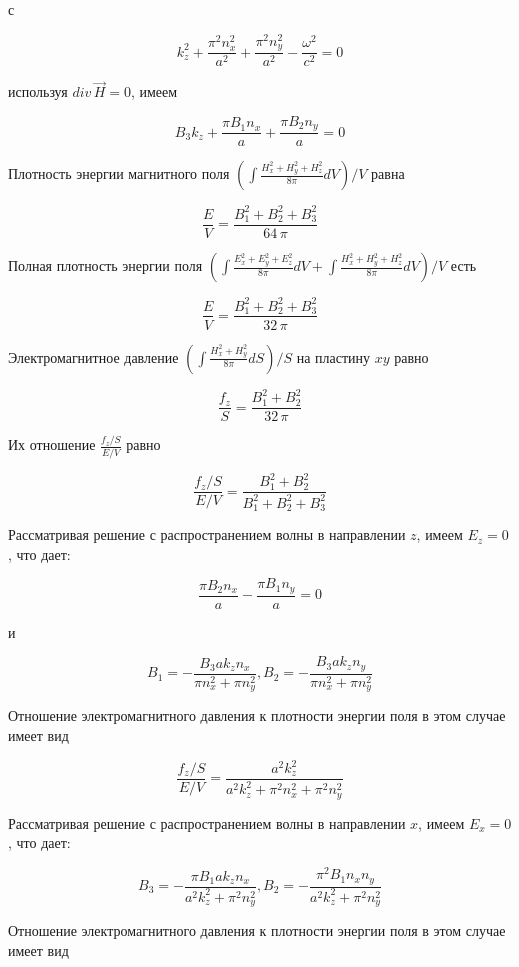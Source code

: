\documentclass[11pt]{article}
\begin{document}
    с

\[k_{z}^{2} + \frac{\pi^{2} n_{x}^{2}}{a^{2}} + \frac{\pi^{2} n_{y}^{2}}{a^{2}} - \frac{\omega^{2}}{c^{2}} = 0\]

    используя \(div\,\vec{H} = 0\), имеем

\[B_{3} k_{z} + \frac{\pi B_{1} n_{x}}{a} + \frac{\pi B_{2} n_{y}}{a} = 0\]

    Плотность энергии магнитного поля
\(\left(\int \frac{H_x^2+H_y^2+H_z^2}{8 \pi}dV\right)\big/{V}\) равна

\[\frac{E}{V} = \frac{{B_{1}^{2} + B_{2}^{2} + B_{3}^{2}}}{64 \, \pi}\]

    Полная плотность энергии поля
\(\left(\int \frac{E_x^2+E_y^2+E_z^2}{8 \pi}dV + \int \frac{H_x^2+H_y^2+H_z^2}{ 8 \pi}dV\right)\big/{V}\)
есть

    \[\frac{E}{V} = \frac{{B_{1}^{2} + B_{2}^{2} + B_{3}^{2}}}{32 \, \pi}\]

    Электромагнитное давление
\(\left({\int \frac {H_x^2+H_y^2}{8 \pi} dS}\right)\big/{S}\) на
пластину \(xy\) равно

\[\frac{f_z}{S}=\frac{{B_{1}^{2} + B_{2}^{2}}}{32 \, \pi}\]

Их отношение \(\frac{f_z/S}{E/V}\) равно

\[\frac{f_z/S}{E/V} = \frac{{B_{1}^{2} + B_{2}^{2}}}{B_{1}^{2} + B_{2}^{2} + B_{3}^{2}}\]

Рассматривая решение с распространением волны в направлении \(z\), имеем
\(E_z = 0\), что дает:

\[\frac{\pi B_{2} n_{x}}{a} - \frac{\pi B_{1} n_{y}}{a} = 0\]

и

\[B_1 = -\frac{B_{3} a k_{z} n_{x}}{\pi n_{x}^{2} + \pi n_{y}^{2}},
B_2 = -\frac{B_{3} a k_{z} n_{y}}{\pi n_{x}^{2} + \pi n_{y}^{2}}\]

Отношение электромагнитного давления к плотности энергии поля в этом
случае имеет вид

\[\frac{f_z/S}{E/V} = \frac{a^{2} k_{z}^{2}}{a^{2} k_{z}^{2} + \pi^{2} n_{x}^{2} + \pi^{2} n_{y}^{2}}\]

    Рассматривая решение с распространением волны в направлении \(x\), имеем
\(E_x = 0\), что дает:

\[B_3 = -\frac{\pi B_{1} a k_{z} n_{x}}{a^{2} k_{z}^{2} + \pi^{2} n_{y}^{2}}, 
B_2 = -\frac{\pi^{2} B_{1} n_{x} n_{y}}{a^{2} k_{z}^{2} + \pi^{2} n_{y}^{2}}\]

Отношение электромагнитного давления к плотности энергии поля в этом
случае имеет вид
\end{document}
